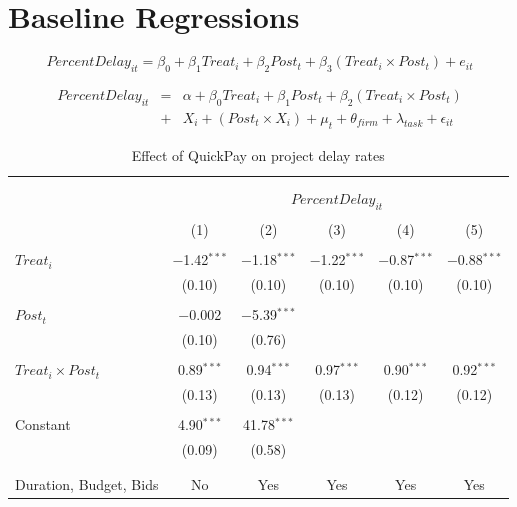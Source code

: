 \documentclass[
]{article}
\begin{document}
\hypertarget{baseline-regressions}{%
\section{Baseline Regressions}\label{baseline-regressions}}

\[ PercentDelay_{it} = \beta_0 + \beta_1 Treat_i + \beta_2 Post_t + \beta_3 (Treat_i \times Post_t) + e_{it}\]

\[ \begin{aligned} PercentDelay_{it} &=& \alpha+\beta_0 Treat_i + \beta_1 Post_t + \beta_2 (Treat_i \times Post_t)\\
&+&  X_i + (Post_t \times X_i) + \mu_t + \theta_{firm} + \lambda_{task}+ \epsilon_{it}
\end{aligned}\]

\begin{table}[H] \centering 
  \caption{Effect of QuickPay on project delay rates} 
  \label{} 
\small 
\begin{tabular}{@{\extracolsep{-2pt}}lccccc} 
\\[-1.8ex]\hline 
\hline \\[-1.8ex] 
\\[-1.8ex] & \multicolumn{5}{c}{$PercentDelay_{it}$} \\ 
\\[-1.8ex] & (1) & (2) & (3) & (4) & (5)\\ 
\hline \\[-1.8ex] 
 $Treat_i$ & $-$1.42$^{***}$ & $-$1.18$^{***}$ & $-$1.22$^{***}$ & $-$0.87$^{***}$ & $-$0.88$^{***}$ \\ 
  & (0.10) & (0.10) & (0.10) & (0.10) & (0.10) \\ 
  & & & & & \\ 
 $Post_t$ & $-$0.002 & $-$5.39$^{***}$ &  &  &  \\ 
  & (0.10) & (0.76) &  &  &  \\ 
  & & & & & \\ 
 $Treat_i \times Post_t$ & 0.89$^{***}$ & 0.94$^{***}$ & 0.97$^{***}$ & 0.90$^{***}$ & 0.92$^{***}$ \\ 
  & (0.13) & (0.13) & (0.13) & (0.12) & (0.12) \\ 
  & & & & & \\ 
 Constant & 4.90$^{***}$ & 41.78$^{***}$ &  &  &  \\ 
  & (0.09) & (0.58) &  &  &  \\ 
  & & & & & \\ 
\hline \\[-1.8ex] 
Duration, Budget, Bids & No & Yes & Yes & Yes & Yes \\ 

\end{tabular}
\end{table}
\end{document}
